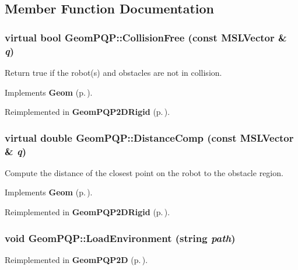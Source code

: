 \subsection{Member Function Documentation}
\subsubsection{\setlength{\rightskip}{0pt plus 5cm}virtual bool Geom\-PQP::Collision\-Free (const {\bf MSLVector} \& {\em q})\hspace{0.3cm}{\tt  [inline, virtual]}}\label{classGeomPQP_a4}


Return true if the robot(s) and obstacles are not in collision.



Implements {\bf Geom} {\rm (p.\,\pageref{classGeom_a2})}.

Reimplemented in {\bf Geom\-PQP2DRigid} {\rm (p.\,\pageref{classGeomPQP2DRigid_a2})}.
\subsubsection{\setlength{\rightskip}{0pt plus 5cm}virtual double Geom\-PQP::Distance\-Comp (const {\bf MSLVector} \& {\em q})\hspace{0.3cm}{\tt  [inline, virtual]}}\label{classGeomPQP_a5}


Compute the distance of the closest point on the robot to the obstacle region.



Implements {\bf Geom} {\rm (p.\,\pageref{classGeom_a3})}.

Reimplemented in {\bf Geom\-PQP2DRigid} {\rm (p.\,\pageref{classGeomPQP2DRigid_a3})}.
\subsubsection{\setlength{\rightskip}{0pt plus 5cm}void Geom\-PQP::Load\-Environment (string {\em path})\hspace{0.3cm}{\tt  [virtual]}}\label{classGeomPQP_a2}




Reimplemented in {\bf Geom\-PQP2D} {\rm (p.\,\pageref{classGeomPQP2D_a2})}.
